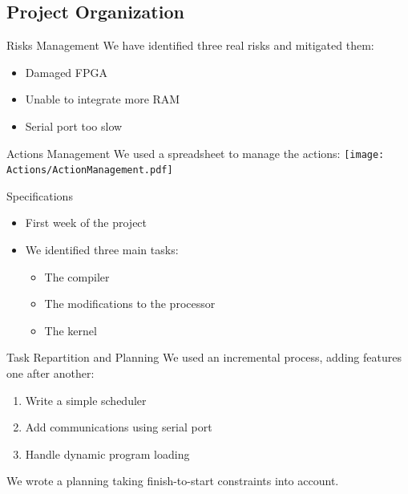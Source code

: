\documentclass{beamer}
\begin{document}
    \subsection{Project Organization}
      \begin{frame}{Risks Management}
        We have identified three real risks and mitigated them:
        \begin{itemize}
          \item Damaged FPGA
          \item Unable to integrate more RAM
          \item Serial port too slow
        \end{itemize}
      \end{frame}

      \begin{frame}{Actions Management}
        We used a spreadsheet to manage the actions:
          \texttt{[image: Actions/ActionManagement.pdf]}
      \end{frame}

      \begin{frame}{Specifications}
        \begin{itemize}
          \item First week of the project
          \item We identified three main tasks:
            \begin{itemize}
              \item The compiler
              \item The modifications to the processor
              \item The kernel
            \end{itemize}
          \end{itemize}
      \end{frame}

      \begin{frame}{Task Repartition and Planning}
          We used an incremental process, adding features one after another:
          \begin{enumerate}
            \item Write a simple scheduler
            \item Add communications using serial port
            \item Handle dynamic program loading
          \end{enumerate}

          We wrote a planning taking finish-to-start constraints into account.
      \end{frame}
\end{document}
